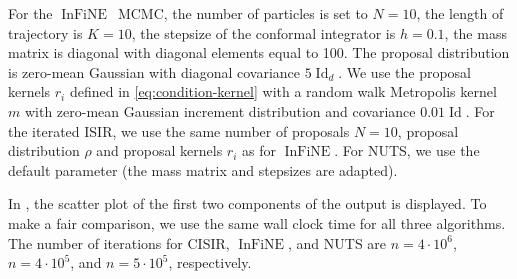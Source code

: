 \documentclass{article}
\def\IFIS{\ensuremath{\operatorname{InFiNE}}}
\def\InFiNE{{\small \IFIS}}
\def\Id{\operatorname{Id}}
\newcommand{\1}{\mathds{1}}
\def\Id{\operatorname{Id}}
\def\Id{\operatorname{Id}}
\def\proposal{\rho}
\begin{document}
For the \InFiNE\ MCMC, the number of particles is set to $N=10$, the length of trajectory is $K=10$, the stepsize of the conformal integrator is $h=0.1$, the mass matrix is diagonal with diagonal elements equal to 100. The proposal distribution is zero-mean Gaussian with diagonal covariance $5 \Id_d$. We use the proposal kernels $r_i$ defined in \eqref{eq:condition-kernel} with a random walk Metropolis kernel $m$ with zero-mean Gaussian increment distribution and covariance $0.01 \Id$.
For the iterated ISIR, we use the same number of proposals $N=10$,  proposal distribution $\proposal$ and proposal kernels $r_i$ as for \IFIS.  For NUTS, we use the default parameter (the mass matrix and stepsizes are adapted).

In , the scatter plot of the first two components of the output is displayed. To make a fair comparison, we use the same wall clock time for all three algorithms. The number of iterations for CISIR, \IFIS, and NUTS are $n= 4\cdot 10^6$, $n= 4 \cdot 10^5$, and $n= 5 \cdot 10^5$, respectively.
\end{document}
